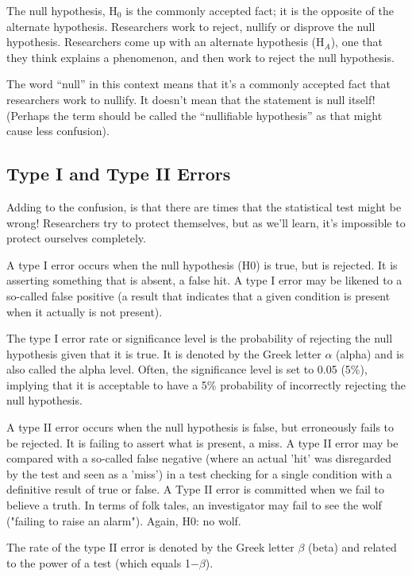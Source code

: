 \documentclass{article}\usepackage[]{graphicx}\usepackage[]{color}
\begin{document}
The null hypothesis, H$_0$ is the commonly accepted fact; it is the opposite of the alternate hypothesis. Researchers work to reject, nullify or disprove the null hypothesis. Researchers come up with an alternate hypothesis (H$_A$), one that they think explains a phenomenon, and then work to reject the null hypothesis.

The word “null” in this context means that it’s a commonly accepted fact that researchers work to nullify. It doesn’t mean that the statement is null itself! (Perhaps the term should be called the “nullifiable hypothesis” as that might cause less confusion).

\subsection{Type I and Type II Errors}

Adding to the confusion, is that there are times that the statistical test might be wrong!  Researchers try to protect themselves, but as we'll learn, it's impossible to protect ourselves completely. 

A type I error occurs when the null hypothesis (H0) is true, but is rejected. It is asserting something that is absent, a false hit. A type I error may be likened to a so-called false positive (a result that indicates that a given condition is present when it actually is not present).

The type I error rate or significance level is the probability of rejecting the null hypothesis given that it is true. It is denoted by the Greek letter $\alpha$ (alpha) and is also called the alpha level. Often, the significance level is set to 0.05 (5\%), implying that it is acceptable to have a 5\% probability of incorrectly rejecting the null hypothesis.

A type II error occurs when the null hypothesis is false, but erroneously fails to be rejected. It is failing to assert what is present, a miss. A type II error may be compared with a so-called false negative (where an actual 'hit' was disregarded by the test and seen as a 'miss') in a test checking for a single condition with a definitive result of true or false. A Type II error is committed when we fail to believe a truth. In terms of folk tales, an investigator may fail to see the wolf ("failing to raise an alarm"). Again, H0: no wolf.

The rate of the type II error is denoted by the Greek letter $\beta$ (beta) and related to the power of a test (which equals 1−$\beta$).
\end{document}
